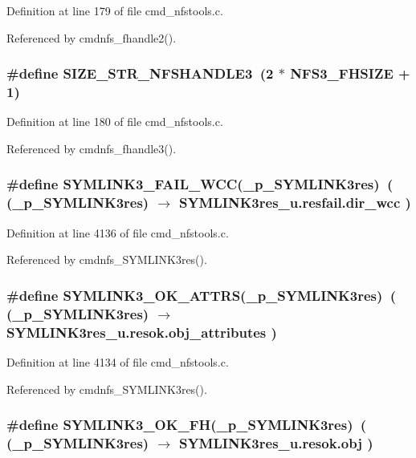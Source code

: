 Definition at line 179 of file cmd\_\-nfstools.c.

Referenced by cmdnfs\_\-fhandle2().
\subsubsection{\setlength{\rightskip}{0pt plus 5cm}\#define SIZE\_\-STR\_\-NFSHANDLE3\ (2 $\ast$ NFS3\_\-FHSIZE + 1)}\label{cmd__nfstools_8c_a1}




Definition at line 180 of file cmd\_\-nfstools.c.

Referenced by cmdnfs\_\-fhandle3().
\subsubsection{\setlength{\rightskip}{0pt plus 5cm}\#define SYMLINK3\_\-FAIL\_\-WCC(\_\-p\_\-SYMLINK3res)\ ( (\_\-p\_\-SYMLINK3res) $\rightarrow$ SYMLINK3res\_\-u.resfail.dir\_\-wcc )}\label{cmd__nfstools_8c_a50}




Definition at line 4136 of file cmd\_\-nfstools.c.

Referenced by cmdnfs\_\-SYMLINK3res().
\subsubsection{\setlength{\rightskip}{0pt plus 5cm}\#define SYMLINK3\_\-OK\_\-ATTRS(\_\-p\_\-SYMLINK3res)\ ( (\_\-p\_\-SYMLINK3res) $\rightarrow$ SYMLINK3res\_\-u.resok.obj\_\-attributes )}\label{cmd__nfstools_8c_a48}




Definition at line 4134 of file cmd\_\-nfstools.c.

Referenced by cmdnfs\_\-SYMLINK3res().
\subsubsection{\setlength{\rightskip}{0pt plus 5cm}\#define SYMLINK3\_\-OK\_\-FH(\_\-p\_\-SYMLINK3res)\ ( (\_\-p\_\-SYMLINK3res) $\rightarrow$ SYMLINK3res\_\-u.resok.obj )}\label{cmd__nfstools_8c_a47}




